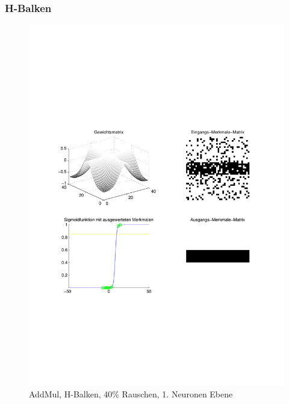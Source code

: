 \subsubsection{H-Balken}
\begin{figure}[hbt]
	\begin{minipage}[c]{\textwidth}
       	\includegraphics[width=\textwidth]{./Bilder/Auswertung/Endergebnis/TypeAddMul_Rauschen40_H_Line_Layer1}
		\caption{AddMul, H-Balken, 40\% Rauschen, 1. Neuronen Ebene}
		\label{AddMul_H_40_1}

\end{minipage}
\end{figure}

